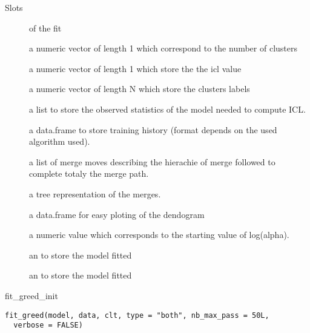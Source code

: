 \documentclass[letterpaper]{book}
\begin{document}
\begin{Section}{Slots}

\begin{description}

\item[] of the fit

\item[] a numeric vector of length 1 which correspond to the number of clusters

\item[] a numeric vector of length 1 which store the the icl value

\item[] a numeric vector of length N which store the clusters labels

\item[] a list to store the observed statistics of the model needed to compute ICL.

\item[] a data.frame to store training history (format depends on the used algorithm used).

\item[] a list of merge moves describing the hierachie of merge followed to complete totaly the merge path.

\item[] a tree representation of the merges.

\item[] a data.frame for easy ploting of the dendogram

\item[] a numeric value which corresponds to the starting value of log(alpha).

\item[] an  to store the model fitted

\item[] an  to store the model fitted

\end{description}
\end{Section}
%
\begin{Description}\relax
fit\_greed\_init
\end{Description}
%
\begin{Usage}
\begin{verbatim}
fit_greed(model, data, clt, type = "both", nb_max_pass = 50L,
  verbose = FALSE)
\end{verbatim}
\end{Usage}
\end{document}
